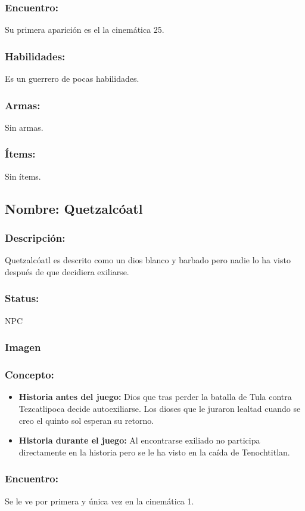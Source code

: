 \documentclass[11pt,letterpaper]{article}
\begin{document}
\subsubsection{Encuentro:}
Su primera aparición es el la cinemática 25.
\subsubsection{Habilidades:}
Es un guerrero de pocas habilidades. 
\subsubsection{Armas:}
Sin armas.
\subsubsection{Ítems:}
Sin ítems.


\subsection{Nombre: Quetzalcóatl}  \label{per.quetzalcoatl}
\subsubsection{Descripción:}
Quetzalcóatl es descrito como un dios blanco y barbado pero nadie lo ha visto después de que decidiera exiliarse.
\subsubsection{Status:}
NPC 
\subsubsection{Imagen}
\subsubsection{Concepto:}
\begin{itemize}
	\item \textbf{Historia antes del juego:}
	Dios que tras perder la batalla de Tula contra Tezcatlipoca decide autoexiliarse. Los dioses que le juraron lealtad cuando se creo el quinto sol esperan su retorno.
	\item \textbf{Historia durante el juego:}
	Al encontrarse exiliado no participa directamente en la historia pero se le ha visto en la caída de Tenochtitlan.
\end{itemize} 
\subsubsection{Encuentro:}
Se le ve por primera y única vez en la cinemática 1.
\end{document}
